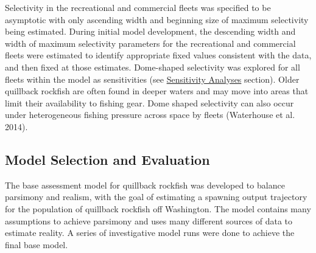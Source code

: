 \documentclass[11pt,
  english,
  a4paper,
]{article}
\begin{document}
\leavevmode\tagmcend\tagstructend\par


Selectivity in the recreational and commercial fleets was specified to be asymptotic with only ascending width and beginning size of maximum selectivity being estimated. During initial model development, the descending width and width of maximum selectivity parameters for the recreational and commercial fleets were estimated to identify appropriate fixed values consistent with the data, and then fixed at those estimates. Dome-shaped selectivity was explored for all fleets within the model as sensitivities (see {\protect\hyperlink{sensitivity-analyses}{Sensitivity Analyses}\leavevmode\tagmcend\tagstructend} section). Older quillback rockfish are often found in deeper waters and may move into areas that limit their availability to fishing gear. Dome shaped selectivity can also occur under heterogeneous fishing pressure across space by fleets {(Waterhouse et al. 2014)\leavevmode\tagmcend\tagstructend}.

\leavevmode\tagmcend\tagstructend\par


\hypertarget{model-selection-and-evaluation}{%
\subsection{Model Selection and Evaluation}\label{model-selection-and-evaluation}}

\leavevmode\tagmcend\tagstructend


The base assessment model for quillback rockfish was developed to balance parsimony and realism, with the goal of estimating a spawning output trajectory for the population of quillback rockfish off Washington. The model contains many assumptions to achieve parsimony and uses many different sources of data to estimate reality. A series of investigative model runs were done to achieve the final base model.

\leavevmode\tagmcend\tagstructend\par

\end{document}
